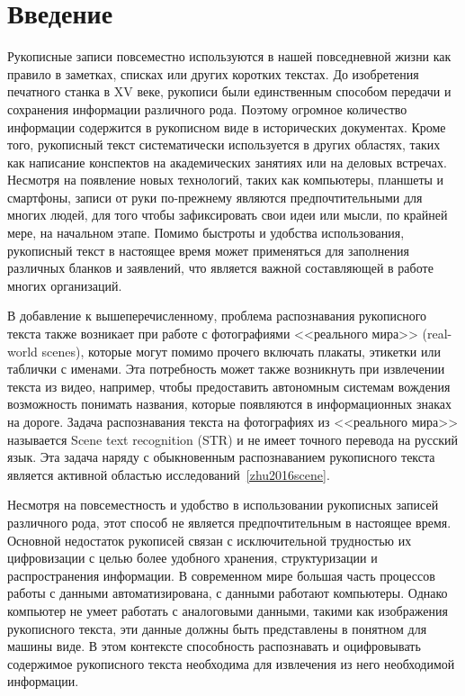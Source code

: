 \section{Введение}
\label{sec:Chapter0} 


Рукописные записи повсеместно используются в нашей повседневной жизни как правило в заметках, списках или других коротких текстах.
До изобретения печатного станка в XV веке, рукописи были единственным способом передачи и сохранения информации различного рода.
Поэтому огромное количество информации содержится в рукописном виде в исторических документах.
Кроме того, рукописный текст систематически используется в других областях, таких как написание конспектов на академических занятиях или на деловых встречах.
Несмотря на появление новых технологий, таких как компьютеры, планшеты и смартфоны, записи от руки по-прежнему являются предпочтительными для многих людей,
для того чтобы зафиксировать свои идеи или мысли, по крайней мере, на начальном этапе.
Помимо быстроты и удобства использования, рукописный текст в настоящее время может применяться для заполнения различных бланков и заявлений,
что является важной составляющей в работе многих организаций.

В добавление к вышеперечисленному, проблема распознавания рукописного текста также возникает при работе
с фотографиями <<реального мира>> (real-world scenes), которые могут помимо прочего включать плакаты, этикетки или таблички с именами.
Эта потребность может также возникнуть при извлечении текста из видео, например, чтобы предоставить автономным системам вождения возможность понимать названия,
которые появляются в информационных знаках на дороге.
Задача распознавания текста на фотографиях из <<реального мира>> называется Scene text recognition (STR) и не имеет точного перевода на русский язык.
Эта задача наряду с обыкновенным распознаванием рукописного текста является активной областью исследований~\ref{zhu2016scene}.

Несмотря на повсеместность и удобство в использовании рукописных записей различного рода, этот способ не является предпочтительным в настоящее время.
Основной недостаток рукописей связан с исключительной трудностью их цифровизации с целью более удобного хранения, структуризации и распространения информации.
В современном мире большая часть процессов работы с данными автоматизирована, с данными работают компьютеры.
Однако компьютер не умеет работать с аналоговыми данными, такими как изображения рукописного текста, эти данные должны быть представлены в понятном для машины виде.
В этом контексте способность распознавать и оцифровывать содержимое рукописного текста необходима для извлечения из него необходимой информации.

